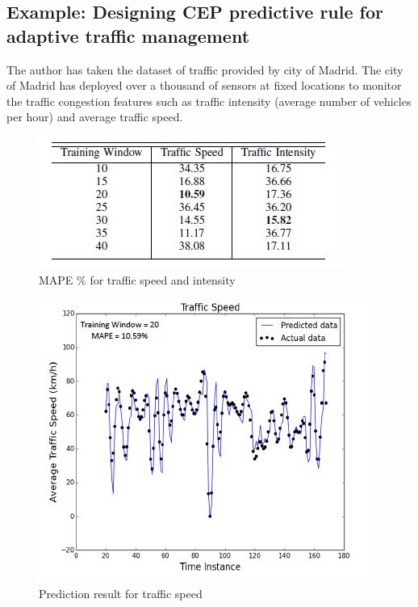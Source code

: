 \documentclass[runningheads]{llncs}
\begin{document}
\subsection{Example: Designing CEP predictive rule for adaptive traffic management} The author has taken the dataset of traffic provided by city of Madrid. The city of Madrid has deployed over a thousand of sensors at fixed locations to monitor the traffic congestion features such as traffic intensity (average number of vehicles per hour) and average traffic speed.
\begin{figure}
	\centering
	\includegraphics[width=0.8\linewidth]{Figure15.jpg}
	\caption{MAPE \% for traffic speed and intensity \cite{17}}
	\label{fig:figure13}
\end{figure}
 \begin{figure}
	\centering
	\includegraphics[width=0.8\linewidth]{Figure16.jpg}
	\caption{Prediction result for traffic speed \cite{17}}
	\label{fig:figure14}
\end{figure}
\end{document}
